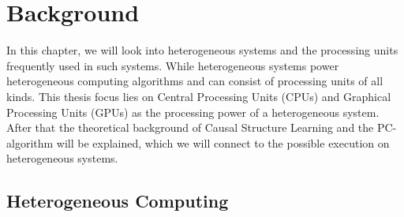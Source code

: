 \chapter{Background}
In this chapter, we will look into heterogeneous systems and the processing units frequently used in such systems. While heterogeneous systems power heterogeneous computing algorithms and can consist of processing units of all kinds. This thesis focus lies on Central Processing Units (CPUs) and Graphical Processing Units (GPUs) as the processing power of a heterogeneous system.
After that the theoretical background of Causal Structure Learning and the PC-algorithm will be explained, which we will connect to the possible execution on heterogeneous systems.

\section{Heterogeneous Computing}
